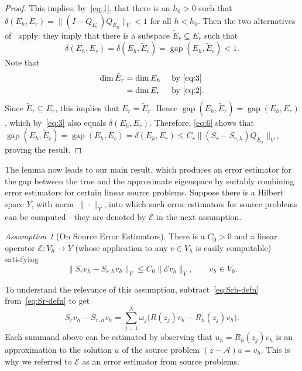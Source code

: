 \documentclass[12pt, oneside, reqno]{amsart}
\theoremstyle{remark}
\newtheorem{assumption}[theorem]{Assumption}
\DeclareMathOperator{\gap}{gap}
\newcommand{\nquad}{N}
\newcommand{\Srh}{S_{r, h}}
\newcommand{\EE}{\mathcal{E}}
\newcommand{\Ac}{\mathcal{A}}
\begin{document}
\begin{proof}
  This implies, by~\eqref{eq:1}, that there is an $h_0>0$ such that
  $\delta(E_h, E_r) = \| (I - Q_{E_r} ) Q_{E_h}\|_V < 1$ for all
  $h < h_0$. Then the two alternatives
  of~\cite[Theorem~I.6.34]{Kat2013-1} apply: they imply that there is
  a subspace $\tilde E_r \subseteq E_r$ such that
  \begin{equation}
    \label{eq:3}
    \delta(E_h, E_r) = \delta(E_h, \tilde E_r) = \gap(E_h, \tilde E_r) < 1.
  \end{equation}
  Note that
  \begin{align*}
    \dim \tilde{E}_r
    & = \dim E_h
    && \text{ by~\eqref{eq:3}}
    \\
    & = \dim E_r
    && \text{ by~\eqref{eq:2}}.
  \end{align*}
  Since $\tilde E_r \subseteq E_r$, this implies that
  $E_r = \tilde E_r$. Hence $\gap(E_h, \tilde E_r) = \gap(E_h, E_r)$,
  which by~\eqref{eq:3} also equals $ \delta(E_h, E_r)$. Therefore,
  \eqref{eq:6} shows that
  $ \gap(E_h, \tilde E_r) =
  \gap(E_h, E_r) =  \delta(E_h, E_r)\le C_r \| (S_r - \Srh)
  Q_{E_h} \|_V$, proving the result.
\end{proof}

\bigskip

The lemma now leads to our main result, which produces an error
estimator for the gap between the true and the approximate eigenspace
by suitably combining error estimators for certain linear source
problems.  Suppose there is a Hilbert space $Y$, with
norm~$\| \cdot \|_{Y}$, into which such error estimators for source
problems can be computed---they are denoted by $\EE$ in the next
assumption.

\begin{assumption}[On Source Error Estimators]
  \label{asm:source-ee}
  There is a $C_0>0$ and a linear
  operator $\EE: V_h \to Y$ (whose application to any $v \in V_h$ is easily computable) satisfying
  \begin{equation}
    \label{eq:EE}
    \| S_r v_h - \Srh v_h \|_V \le C_0 \| \EE v_h\|_{Y}, \qquad v_h \in V_h.
  \end{equation}
\end{assumption}

To understand the relevance of this assumption, subtract~\eqref{eq:Srh-defn} from~\eqref{eq:Sr-defn} to get 
\[
  S_r v_h - \Srh v_h =
  \sum_{j=1}^\nquad \omega_j \big( R(z_j) v_h - R_h(z_j) v_h\big).
\]
Each summand above can be estimated by observing that
$u_h = R_h(z_j) v_h$ is an approximation to the solution $u$ of the
source problem $ (z - \Ac) u = v_h$. This is why we referred to
$\EE$ as an error estimator from source problems.
\end{document}
